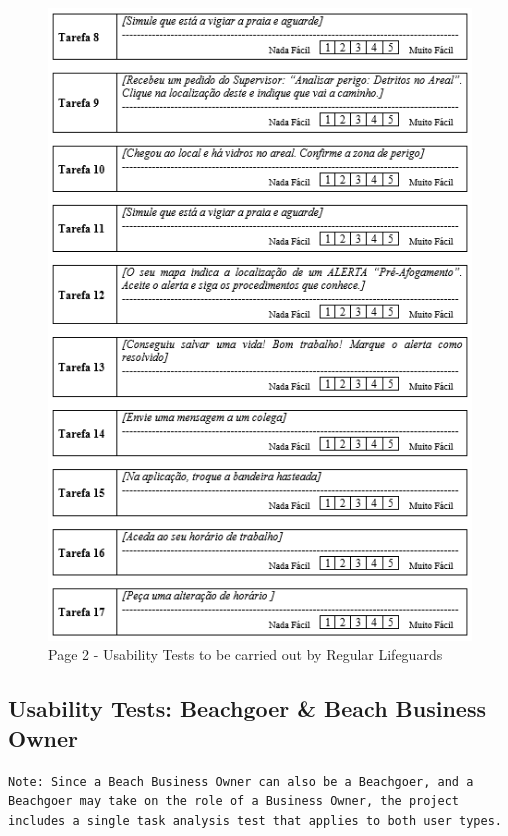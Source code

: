 \begin{figure}[H]
      \centering
      \includegraphics[width=14cm]{figs/UsabilityTest_Regular_2.png}
      \caption{Page 2 - Usability Tests to be carried out by Regular Lifeguards}
      \label{fig:UsabilityTest_Regular_2}
\end{figure}

\subsection{Usability Tests: Beachgoer \& Beach Business Owner}
\label{section:task_regular_lifeguard}
\texttt{Note: Since a Beach Business Owner can also be a Beachgoer, and a Beachgoer may take on the role of a Business Owner, the project includes a single task analysis test that applies to both user types.}

